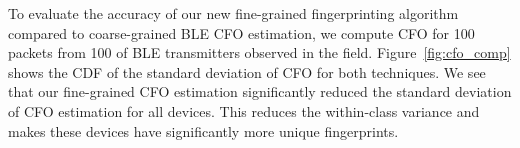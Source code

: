 %
To evaluate the accuracy of our new fine-grained fingerprinting algorithm compared to coarse-grained BLE
CFO estimation, 
we compute CFO for 100 packets from 100 of BLE transmitters observed in the field.%
%
Figure~\ref{fig:cfo_comp} shows the CDF of the standard deviation of CFO for both techniques.
%
We see that 
our fine-grained CFO estimation significantly reduced the standard deviation of CFO estimation for all devices. This reduces the within-class variance and
makes these devices have significantly more unique fingerprints.
%

